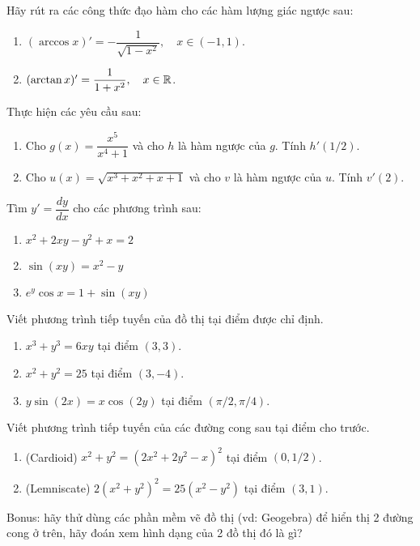 \begin{exercise}
    Hãy rút ra các công thức đạo hàm cho các hàm lượng giác ngược sau:
    \begin{enumerate}[label=(\alph*)]
        \item $(\arccos x)' = -\dfrac{1}{\sqrt{1-x^2}},\quad x \in (-1, 1)$.
        \item $(\arctan x)' = \dfrac{1}{1+x^2},\quad x \in \mathbb{R}$.
    \end{enumerate}
\end{exercise}

\begin{exercise} Thực hiện các yêu cầu sau:
    \begin{enumerate}[label=(\alph*)]
        \item Cho $g(x) = \dfrac{x^{5}}{x^{4}+1}$ và cho $h$ là hàm ngược của $g$. Tính $h'(1/2)$.
        \item Cho $u(x) = \sqrt{x^3+x^2+x+1}$ và cho $v$ là hàm ngược của $u$. Tính $v'(2)$.
    \end{enumerate}
\end{exercise}

\begin{exercise}
    Tìm $y'=\dfrac{dy}{dx}$ cho các phương trình sau:
    \begin{enumerate}[label=(\alph*)]
        \item $x^2 + 2xy - y^2 + x = 2$
        \item $\sin(xy) = x^2 - y$
        \item $e^y \cos x = 1 + \sin(xy)$
    \end{enumerate}
\end{exercise}

\begin{exercise}
    Viết phương trình tiếp tuyến của đồ thị tại điểm được chỉ định.
    \begin{enumerate}[label=(\alph*)]
        \item $x^3+y^3=6xy$ tại điểm $(3,3)$. %
        \item $x^2+y^2=25$ tại điểm $(3,-4)$. %
        \item $y \sin(2x) = x \cos(2y)$ tại điểm $(\pi/2, \pi/4)$.
    \end{enumerate}
\end{exercise}

\begin{exercise}
    Viết phương trình tiếp tuyến của các đường cong sau tại điểm cho trước.
    \begin{enumerate}[label=(\alph*)]
        \item (Cardioid) $x^2+y^2=(2x^2+2y^2-x)^2$ tại điểm $(0, 1/2)$.
        \item (Lemniscate) $2(x^2+y^2)^2 = 25(x^2-y^2)$ tại điểm $(3,1)$.
    \end{enumerate}
    Bonus: hãy thử dùng các phần mềm vẽ đồ thị (vd: Geogebra) để hiển thị 2 đường cong ở trên, hãy đoán xem hình dạng của 2 đồ thị đó là gì?
\end{exercise}

